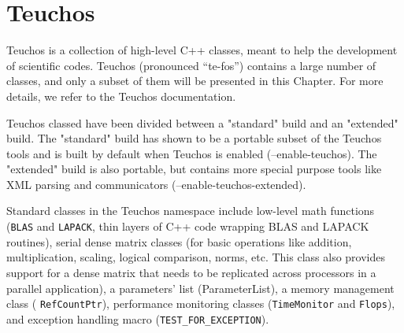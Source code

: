 % 
% 
% 
%   
%   
% 
% 

\section{Teuchos}
\label{chap:triutils}

Teuchos is a collection of high-level C++ classes, meant to 
help the development of scientific codes. Teuchos (pronounced
``te-fos'') contains a large number of classes, and only a subset of
them will be presented in this Chapter. For more details, we refer to
the Teuchos documentation.

Teuchos classed have been divided between a "standard" build and an
"extended" build. The "standard" build has shown to be a portable subset
of the Teuchos tools and is built by default when Teuchos is enabled
(--enable-teuchos). The "extended" build is also portable, but contains
more special purpose tools like XML parsing and communicators
(--enable-teuchos-extended). 

Standard classes in the Teuchos namespace include low-level math functions ({\tt BLAS}
and {\tt LAPACK}, thin layers of C++ code wrapping BLAS and
LAPACK routines), serial dense matrix classes (for basic operations like
addition, multiplication, scaling, logical comparison, norms, etc. This
class also provides support for a dense matrix that needs to be
replicated across processors in a parallel application), a parameters'
list (ParameterList), a memory management class (
\verb!RefCountPtr!), performance monitoring classes
(\verb!TimeMonitor! and \verb!Flops!), and exception
handling macro (\verb!TEST_FOR_EXCEPTION!).

